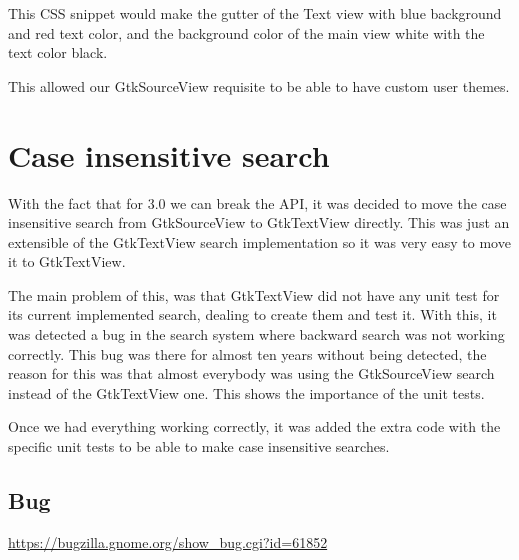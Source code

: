 This CSS snippet would make the gutter of the Text view with blue background and red text color, and the background color of the main view white with the text color black.

This allowed our GtkSourceView requisite to be able to have custom user themes.

\section{Case insensitive search}

With the fact that for 3.0 we can break the API, it was decided to move the case insensitive search from GtkSourceView to GtkTextView directly. This was just an extensible of the GtkTextView search implementation so it was very easy to move it to GtkTextView.

The main problem of this, was that GtkTextView did not have any unit test for its current implemented search, dealing to create them and test it. With this, it was detected a bug in the search system where backward search was not working correctly. This bug was there for almost ten years without being detected, the reason for this was that almost everybody was using the GtkSourceView search instead of the GtkTextView one. This shows the importance of the unit tests.

Once we had everything working correctly, it was added the extra code with the specific unit tests to be able to make case insensitive searches.

\subsection{Bug}

\noindent\url{https://bugzilla.gnome.org/show_bug.cgi?id=61852}
